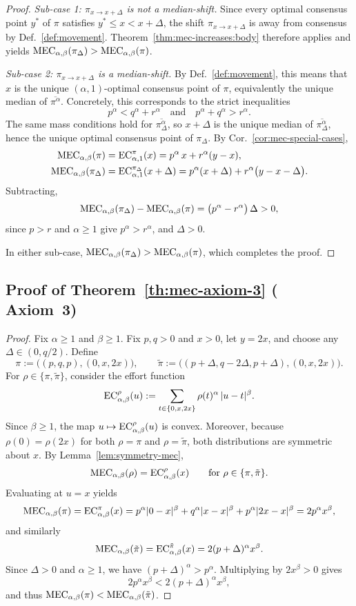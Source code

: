 \begin{proof}
\emph{Sub-case 1: $\pi_{x\to x+\Delta}$ is not a median-shift.}
Since every optimal consensus point $y^*$ of $\pi$ satisfies $y^*\le x<x+\Delta$, the shift $\pi_{x\to x+\Delta}$ is away from consensus by Def.~\ref{def:movement}. Theorem~\ref{thm:mec-increases:body} therefore applies and yields $\MEC(\pi_\Delta)>\MEC(\pi)$.

\emph{Sub-case 2: $\pi_{x\to x+\Delta}$ is a median-shift.}
By Def.~\ref{def:movement}, this means that $x$ is the unique $(\alpha,1)$-optimal consensus point of $\pi$, equivalently the unique median of $\overline{\pi^\alpha}$. Concretely, this corresponds to the strict inequalities
\[
p^\alpha<q^\alpha+r^\alpha
\quad\text{and}\quad
p^\alpha+q^\alpha>r^\alpha.
\]
The same mass conditions hold for $\overline{\pi_\Delta^\alpha}$, so $x+\Delta$ is the unique median of $\overline{\pi_\Delta^\alpha}$, hence the unique optimal consensus point of $\pi_\Delta$. By Cor.~\ref{cor:mec-special-cases},
\begin{align*}
\MEC(\pi)
&=\EC[\alpha,1][\pi](x)
=p^\alpha\,x+r^\alpha(y-x),\\
\MEC(\pi_\Delta)
&=\EC[\alpha,1][\pi_\Delta](x+\Delta)
=p^\alpha(x+\Delta)+r^\alpha\big(y-x-\Delta\big).
\end{align*}
Subtracting,
\[
\MEC(\pi_\Delta)-\MEC(\pi)
=\big(p^\alpha-r^\alpha\big)\,\Delta>0,
\]
since $p>r$ and $\alpha\ge 1$ give $p^\alpha>r^\alpha$, and $\Delta>0$.

In either sub-case, $\MEC(\pi_\Delta)>\MEC(\pi)$, which completes the proof.
\end{proof}

\subsection{Proof of Theorem~\ref{th:mec-axiom-3} (\texorpdfstring{\ERLabel}{ER} Axiom~3)}
\label{appendix:proof-mec-axiom-3}

\mecAxiomThree*
\begin{proof}
Fix $\alpha\ge 1$ and $\beta\ge 1$. Fix $p,q>0$ and $x>0$, let $y=2x$, and choose any $\Delta\in(0,q/2)$. Define
\[
\pi := \big((p,q,p), (0,x,2x)\big), \qquad
\tilde{\pi} := \big((p+\Delta, q-2\Delta, p+\Delta), (0,x,2x)\big).
\]
For $\rho\in\{\pi,\tilde{\pi}\}$, consider the effort function
\[
\EC[\alpha,\beta][\rho](u):=\sum_{t\in\{0,x,2x\}} \rho(t)^\alpha\,|u-t|^\beta.
\]
Since $\beta\ge1$, the map $u\mapsto \EC[\alpha,\beta][\rho](u)$ is convex. Moreover, because $\rho(0)=\rho(2x)$ for both
$\rho=\pi$ and $\rho=\tilde{\pi}$, both distributions are symmetric about $x$. By Lemma~\ref{lem:symmetry-mec},
\[
\MEC(\rho)=\EC[\alpha,\beta][\rho](x)\qquad\text{for }\rho\in\{\pi,\tilde{\pi}\}.
\]
Evaluating at $u=x$ yields
\[
\MEC(\pi)=\EC[\alpha,\beta][\pi](x)
=p^\alpha|0-x|^\beta+q^\alpha|x-x|^\beta+p^\alpha|2x-x|^\beta
=2p^\alpha x^\beta,
\]
and similarly
\[
\MEC(\tilde{\pi})=\EC[\alpha,\beta][\tilde{\pi}](x)
=2(p+\Delta)^\alpha x^\beta.
\]
Since $\Delta>0$ and $\alpha\ge1$, we have $(p+\Delta)^\alpha>p^\alpha$. Multiplying by $2x^\beta>0$ gives
\[
2p^\alpha x^\beta < 2(p+\Delta)^\alpha x^\beta,
\]
and thus $\MEC(\pi)<\MEC(\tilde{\pi})$.
\end{proof}

